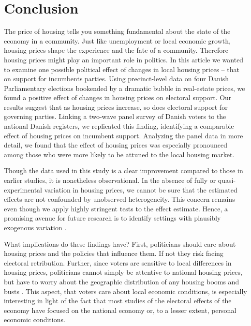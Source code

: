 \documentclass[12pt,a4paper]{article}
\begin{document}
\section{Conclusion}
The price of housing tells you something fundamental about the state of the economy in a community. Just like unemployment or local economic growth, housing prices shape the experience and the fate of a community. Therefore housing prices might play an important role in politics. In this article we wanted to examine one possible political effect of changes in local housing prices – that on support for incumbents parties. Using precinct-level data on four Danish Parliamentary elections bookended by a dramatic bubble in real-estate prices, we found a positive effect of changes in housing prices on electoral support. Our results suggest that as housing prices increase, so does electoral support for governing parties. Linking a two-wave panel survey of Danish voters to the national Danish registers, we replicated this finding, identifying a comparable effect of housing prices on incumbent support. Analyzing the panel data in more detail, we found that the effect of housing prices was especially pronounced among those who were more likely to be attuned to the local housing market. 

Though the data used in this study is a clear improvement compared to those in earlier studies, it is nonetheless observational. In the absence of fully or quasi-experimental variation in housing prices, we cannot be sure that the estimated effects are not confounded by unobserved heterogeneity. This concern remains even though we apply highly stringent tests to the effect estimate. Hence, a promising avenue for future research is to identify settings with plausibly exogenous variation \citep[cf.]{jerzak2016property}. 

What implications do these findings have? First, politicians should care about housing prices and the policies that influence them. If not they risk facing electoral retribution. Further, since voters are sensitive to  local differences in housing prices, politicians cannot simply be attentive to national housing prices, but have to worry about the geographic distribution of any housing booms and busts \citep[cf.][11]{ferejohn1986incumbent}. This aspect, that voters care about local economic conditions, is especially interesting in light of the fact that most studies of the electoral effects of the economy have focused on the national economy or, to a lesser extent, personal economic conditions. 
\end{document}
